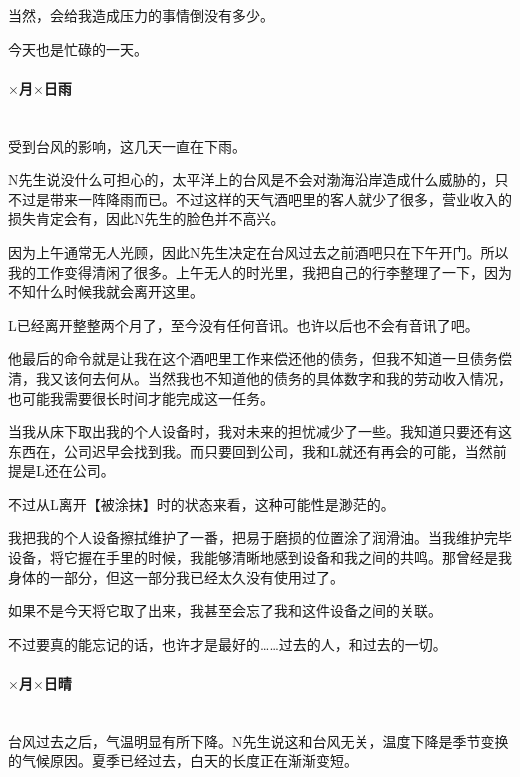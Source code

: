 当然，会给我造成压力的事情倒没有多少。

今天也是忙碌的一天。

\par

\paragraph*{$\times$月$\times$日\quad 雨}\mbox{}\\

受到台风的影响，这几天一直在下雨。

N先生说没什么可担心的，太平洋上的台风是不会对渤海沿岸造成什么威胁的，只不过是带来一阵降雨而已。不过这样的天气酒吧里的客人就少了很多，营业收入的损失肯定会有，因此N先生的脸色并不高兴。

因为上午通常无人光顾，因此N先生决定在台风过去之前酒吧只在下午开门。所以我的工作变得清闲了很多。上午无人的时光里，我把自己的行李整理了一下，因为不知什么时候我就会离开这里。

L已经离开整整两个月了，至今没有任何音讯。也许以后也不会有音讯了吧。

他最后的命令就是让我在这个酒吧里工作来偿还他的债务，但我不知道一旦债务偿清，我又该何去何从。当然我也不知道他的债务的具体数字和我的劳动收入情况，也可能我需要很长时间才能完成这一任务。

当我从床下取出我的个人设备时，我对未来的担忧减少了一些。我知道只要还有这东西在，公司迟早会找到我。而只要回到公司，我和L就还有再会的可能，当然前提是L还在公司。

不过从L离开【被涂抹】时的状态来看，这种可能性是渺茫的。

我把我的个人设备擦拭维护了一番，把易于磨损的位置涂了润滑油。当我维护完毕设备，将它握在手里的时候，我能够清晰地感到设备和我之间的共鸣。那曾经是我身体的一部分，但这一部分我已经太久没有使用过了。

如果不是今天将它取了出来，我甚至会忘了我和这件设备之间的关联。

不过要真的能忘记的话，也许才是最好的……过去的人，和过去的一切。

\par

\paragraph*{$\times$月$\times$日\quad 晴}\mbox{}\\

台风过去之后，气温明显有所下降。N先生说这和台风无关，温度下降是季节变换的气候原因。夏季已经过去，白天的长度正在渐渐变短。

